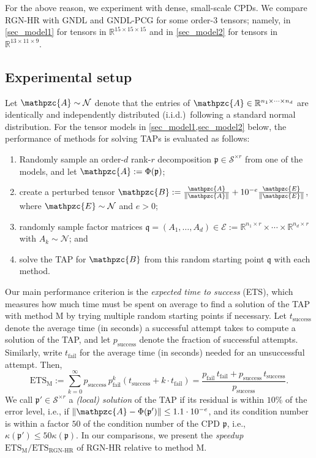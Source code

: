 \documentclass[a4paper,10pt,final]{siamart1116}
\newcommand{\tuple}[1]{\mathfrak{#1}}
\newcommand{\Var}[1]{\mathcal{#1}}
\newcommand{\tensor}[1]{\mathpzc{#1}}
\newcommand{\R}{\mathbb{R}}
\newcommand{\refsec}[1]{{\cref{#1}}}
\numberwithin{equation}{section}
\numberwithin{figure}{section}
\numberwithin{table}{section}
\numberwithin{theorem}{section}
\begin{document}
For {the above} reason, we experiment with dense, small-scale CPDs. We compare RGN-HR with GNDL and GNDL-PCG for some order-$3$ tensors; namely, in \refsec{sec_model1} for tensors in $\R^{15\times 15 \times 15}$ and in  \refsec{sec_model2} for tensors in $\R^{13\times 11 \times 9}$.


\subsection{Experimental setup}
Let $\tensor{A} \sim \Var{N}$ denote that the entries of $\tensor{A} \in \R^{n_1 \times \cdots \times n_d}$ are identically and independently distributed (i.i.d.)\ following a standard normal distribution.
For the tensor models in \cref{sec_model1,sec_model2} below, the performance of methods for solving TAPs is evaluated as follows:
\begin{enumerate}
 \item Randomly sample an order-$d$ rank-$r$ decomposition $\tuple{p} \in \Var{S}^{\times r}$ from one of the models, and let $\tensor{A} := \Phi(\tuple{p})$;
 \item create a perturbed tensor $\tensor{B} := \frac{\tensor{A}}{\|\tensor{A}\|} + 10^{-e} \frac{\tensor{E}}{\|\tensor{E}\|}$, where $\tensor{E} \sim \Var{N}$ and $e >0$;
 \item randomly sample factor matrices $\tuple{q} = (A_1,\ldots,A_d) \in \Var{E} := \R^{n_1 \times r} \times \cdots \times \R^{n_d \times r}$ with $A_k \sim \Var{N}$; and
 \item solve the TAP for $\tensor{B}$ from this random starting point $\tuple{q}$ with each method.
\end{enumerate}
Our main performance criterion is the \emph{expected time to success} (ETS), which measures how much time must be spent on average to find a solution of the TAP with method M by trying multiple random starting points if necessary. Let $t_{\mathrm{success}}$ denote the average time (in seconds) a successful attempt takes to compute a solution of the TAP, and let $p_{\mathrm{success}}$ denote the fraction of successful attempts. Similarly, write $t_{\text{fail}}$ for the average time (in seconds) needed for an unsuccessful attempt. Then,
\[
 \text{ETS}_\text{M} := {\sum_{k=0}^\infty p_{\mathrm{success}} \, p_{\text{fail}}^k (t_{\mathrm{success}} + k \cdot t_{\text{fail}})  = \frac{p_{\text{fail}} \, t_{\text{fail}} + p_{\mathrm{success}} \, t_{\mathrm{success}} }{p_{\mathrm{success}}}.}
\]
We call $\tuple{p}' \in \Var{S}^{\times r}$ a \emph{(local) solution} of the TAP if its residual is within $10\%$ of the error level, i.e., if $\|\tensor{A} - \Phi(\tuple{p}')\| \le 1.1 \cdot 10^{-e}$, and its condition number is within a factor $50$ of the condition number of the CPD $\tuple{p}$, i.e., $\kappa(\tuple{p}') \le 50 \kappa(\tuple{p})$.
In our comparisons, we present the \emph{speedup} ${{\text{ETS}}_{\text{M}}}/{{\text{ETS}}_{\text{RGN-HR}}}$ of RGN-HR relative to method M.
\end{document}
